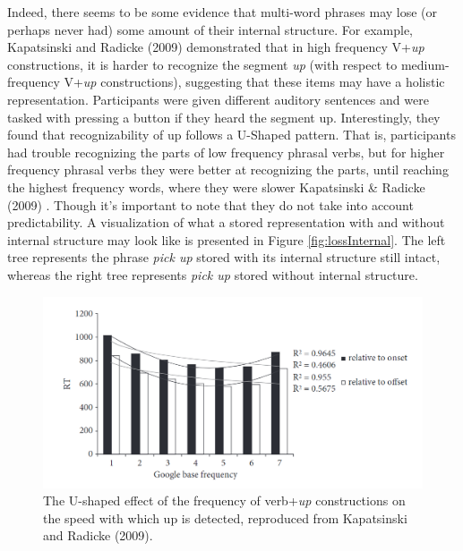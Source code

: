 \documentclass[
  man,floatsintext]{apa6}
\begin{document}
Indeed, there seems to be some evidence that multi-word phrases may lose (or perhaps never had) some amount of their internal structure. For example, Kapatsinski and Radicke (2009) demonstrated that in high frequency V+\emph{up} constructions, it is harder to recognize the segment \emph{up} (with respect to medium-frequency V+\emph{up} constructions), suggesting that these items may have a holistic representation. Participants were given different auditory sentences and were tasked with pressing a button if they heard the segment up. Interestingly, they found that recognizability of up follows a U-Shaped pattern. That is, participants had trouble recognizing the parts of low frequency phrasal verbs, but for higher frequency phrasal verbs they were better at recognizing the parts, until reaching the highest frequency words, where they were slower Kapatsinski \& Radicke (2009) . Though it's important to note that they do not take into account predictability. A visualization of what a stored representation with and without internal structure may look like is presented in Figure \ref{fig:lossInternal}. The left tree represents the phrase \emph{pick up} stored with its internal structure still intact, whereas the right tree represents \emph{pick up} stored without internal structure.



\begin{figure}

{\centering \includegraphics[width=0.7\linewidth]{Figures/kapatsinskiradicke_graph} 

}

\caption{The U-shaped effect of the frequency of verb+\emph{up} constructions on the speed with which up is detected, reproduced from Kapatsinski and Radicke (2009).}\label{fig:kapatsinskiplot}
\end{figure}
\end{document}
